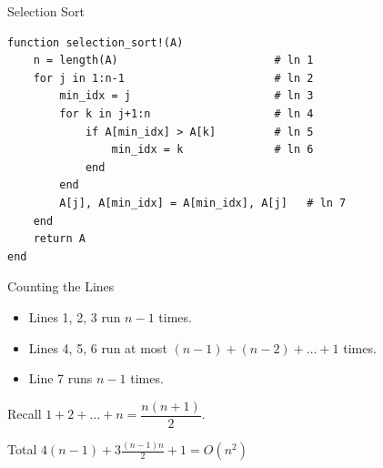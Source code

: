 \documentclass[10pt,aspectratio=169]{beamer}
\begin{document}
\begin{frame}[fragile]{Selection Sort}
  \begin{lstlisting}
function selection_sort!(A)
    n = length(A)                        # ln 1
    for j in 1:n-1                       # ln 2
        min_idx = j                      # ln 3
        for k in j+1:n                   # ln 4
            if A[min_idx] > A[k]         # ln 5
                min_idx = k              # ln 6
            end
        end
        A[j], A[min_idx] = A[min_idx], A[j]   # ln 7
    end
    return A
end
  \end{lstlisting}
\end{frame}

\begin{frame}{Counting the Lines}
  \begin{itemize}
    \item Lines 1, 2, 3 run $n-1$ times.
    \item Lines 4, 5, 6 run at most $(n-1)+(n-2)+\ldots+1$ times.
    \item Line 7 runs $n-1$ times.
  \end{itemize}

  \bigskip
  \begin{center}
  \end{center}

  \bigskip
  Recall $1+2+\ldots+n = \dfrac{n(n+1)}{2}$.
  \pause 
  \begin{alertblock}{Total}
    $\displaystyle 4(n-1) + 3\frac{(n-1)n}{2} + 1 = O(n^2)$
  \end{alertblock}
\end{frame}
\end{document}
